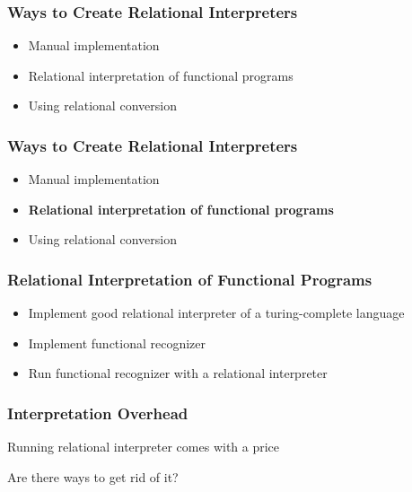 \documentclass[xcolor=table]{beamer}
\begin{document}
\begin{frame}[fragile]
  \transwipe[direction=90]
  \frametitle{Ways to Create Relational Interpreters}
\begin{itemize}
	\item Manual implementation
	\item Relational interpretation of functional programs
	\item Using relational conversion 
\end{itemize}
\end{frame}

\begin{frame}[fragile]
  \transwipe[direction=90]
  \frametitle{Ways to Create Relational Interpreters}
\begin{itemize}
	\item Manual implementation
	\item \textbf{Relational interpretation of functional programs}
	\item Using relational conversion 
\end{itemize}
\end{frame}

\begin{frame}[fragile]
  \transwipe[direction=90]
  \frametitle{Relational Interpretation of Functional Programs}
\begin{itemize}
	\item Implement good relational interpreter of a turing-complete language
	\item Implement functional recognizer
	\item Run functional recognizer with a relational interpreter 
\end{itemize}
\end{frame}


\begin{frame}[fragile]
  \transwipe[direction=90]
  \frametitle{Interpretation Overhead}
\begin{center} 
Running relational interpreter comes with a price 
\end{center} 


\begin{center} 
Are there ways to get rid of it? 
\end{center} 

\end{frame}
\end{document}
